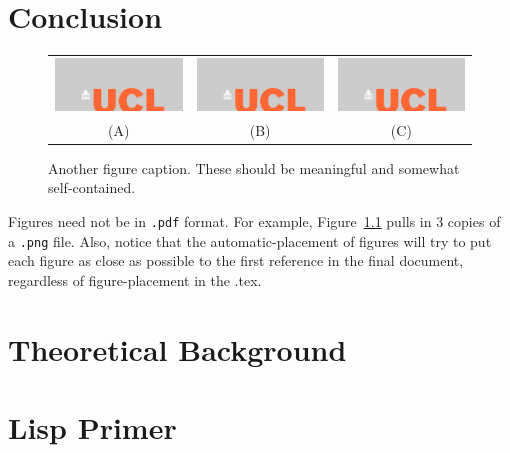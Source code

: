 \documentclass{ucl_thesis}
\begin{document}
\chapter{Conclusion}
\label{chp:conc}
%

\begin{figure}
\begin{center}
\begin{tabular}{c|cc}   %
   \includegraphics[width=.30\columnwidth]{home.png} &  %
   \includegraphics[width=.30\columnwidth]{home.png} &  
   \includegraphics[width=.30\columnwidth]{home.png}\\
   (A) & (B) & (C)
\end{tabular}
\caption{Another figure caption. These should be meaningful and somewhat self-contained.} 
  \label{fig:SomeMoreFigs}
\end{center}
\end{figure}

Figures need not be in \texttt{.pdf} format. For example, Figure~\ref{fig:SomeMoreFigs} pulls in $3$ copies of a \texttt{.png} file. Also, notice that the automatic-placement of figures will try to put each figure as close as possible to the first reference in the final document, regardless of figure-placement in the .tex.




\cleardoublepage
\appendix
\chapter{Theoretical Background}
\label{chp:theory}
%

\chapter{Lisp Primer}
\label{cha:lisp-primer}
%




\end{document}
